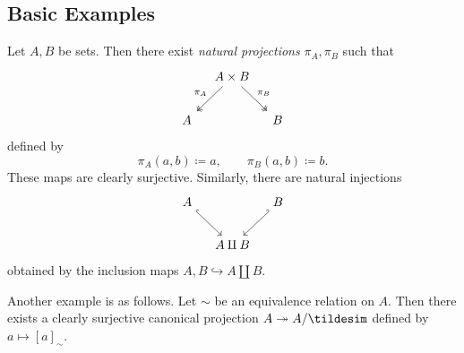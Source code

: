 \subsection{Basic Examples}
Let $A,B$ be sets. Then there exist \emph{natural projections} $\pi_A,\pi _B$ such that
\[\begin{tikzcd}[row sep=2em, column sep=1em]
	&A\times B\arrow[ld, two heads, "\pi_A"']\arrow[dr, two heads, "\pi_B"]\\
	A&&B
\end{tikzcd}\]
defined by
\[
	\pi_A(a,b)\coloneqq a,\qquad \pi_B(a,b)\coloneqq b
.\]
These maps are clearly surjective. Similarly, there are natural injections
\[\begin{tikzcd}[row sep=2em, column sep=1em]
	A\arrow[dr,hook]&&B\arrow[dl,hook']\\
			&A\amalg B
\end{tikzcd}\]
obtained by the inclusion maps $A,B\hookrightarrow A\amalg B$.

Another example is as follows. Let $\sim $ be an equivalence relation on $A$. Then there exists a clearly surjective canonical projection $A\twoheadrightarrow A /\tildesim $ defined by $a\mapsto [a]_\sim $.
